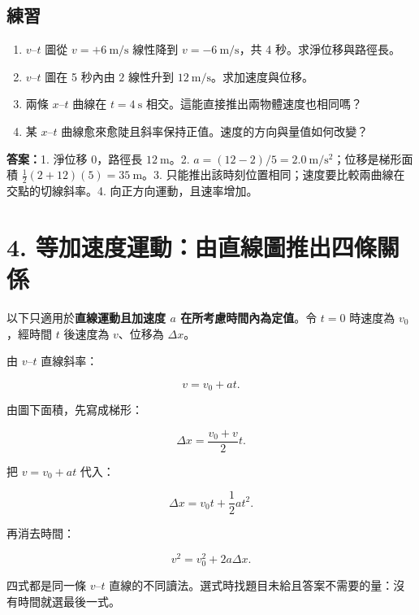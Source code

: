 \documentclass[11pt,a4paper]{article}
\providecommand{\tightlist}{%
  \setlength{\itemsep}{0pt}\setlength{\parskip}{0pt}}
\begin{document}
\begin{HandoutSelfCheck}

\subsection{練習}\label{ux7df4ux7fd2-2}

\begin{enumerate}
\def\labelenumi{\arabic{enumi}.}
\tightlist
\item
  \(v\text{–}t\) 圖從 \(v=+6\ \mathrm{m/s}\) 線性降到 \(v=-6\ \mathrm{m/s}\)，共 4 秒。求淨位移與路徑長。
\item
  \(v\text{–}t\) 圖在 5 秒內由 \(2\) 線性升到 \(12\ \mathrm{m/s}\)。求加速度與位移。
\item
  兩條 \(x\text{–}t\) 曲線在 \(t=4\ \mathrm s\) 相交。這能直接推出兩物體速度也相同嗎？
\item
  某 \(x\text{–}t\) 曲線愈來愈陡且斜率保持正值。速度的方向與量值如何改變？
\end{enumerate}

\textbf{答案：}1. 淨位移 0，路徑長 \(12\ \mathrm m\)。2. \(a=(12-2)/5=2.0\ \mathrm{m/s^2}\)；位移是梯形面積 \(\tfrac12(2+12)(5)=35\ \mathrm m\)。3. 只能推出該時刻位置相同；速度要比較兩曲線在交點的切線斜率。4. 向正方向運動，且速率增加。

\end{HandoutSelfCheck}

\section{4. 等加速度運動：由直線圖推出四條關係}\label{ux7b49ux52a0ux901fux5ea6ux904bux52d5ux7531ux76f4ux7ddaux5716ux63a8ux51faux56dbux689dux95dcux4fc2}

以下只適用於\textbf{直線運動且加速度 \(a\) 在所考慮時間內為定值}。令 \(t=0\) 時速度為 \(v_0\)，經時間 \(t\) 後速度為 \(v\)、位移為 \(\Delta x\)。

由 \(v\text{–}t\) 直線斜率：

\[
\boxed{v=v_0+at}.
\]

由圖下面積，先寫成梯形：

\[
\boxed{\Delta x=\frac{v_0+v}{2}t}.
\]

把 \(v=v_0+at\) 代入：

\[
\boxed{\Delta x=v_0t+\frac12at^2}.
\]

再消去時間：

\[
\boxed{v^2=v_0^2+2a\Delta x}.
\]

四式都是同一條 \(v\text{–}t\) 直線的不同讀法。選式時找題目未給且答案不需要的量：沒有時間就選最後一式。
\end{document}
